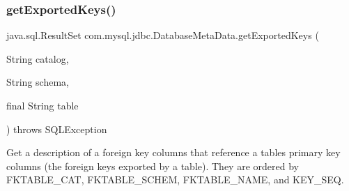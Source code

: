 \subsubsection{\texorpdfstring{get\+Exported\+Keys()}{getExportedKeys()}}
{\footnotesize\ttfamily java.\+sql.\+Result\+Set com.\+mysql.\+jdbc.\+Database\+Meta\+Data.\+get\+Exported\+Keys (\begin{DoxyParamCaption}\item[{String}]{catalog,  }\item[{String}]{schema,  }\item[{final String}]{table }\end{DoxyParamCaption}) throws S\+Q\+L\+Exception}

Get a description of a foreign key columns that reference a table\textquotesingle{}s primary key columns (the foreign keys exported by a table). They are ordered by F\+K\+T\+A\+B\+L\+E\+\_\+\+C\+AT, F\+K\+T\+A\+B\+L\+E\+\_\+\+S\+C\+H\+EM, F\+K\+T\+A\+B\+L\+E\+\_\+\+N\+A\+ME, and K\+E\+Y\+\_\+\+S\+EQ. 

